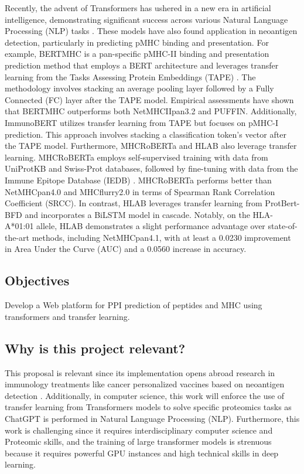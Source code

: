 \documentclass[a4paper,11pt]{article}
\begin{document}
Recently, the advent of Transformers has ushered in a new era in artificial intelligence, demonstrating significant success across various Natural Language Processing (NLP) tasks \cite{patwardhan2023transformers}. These models have also found application in neoantigen detection, particularly in predicting pMHC binding and presentation. For example, BERTMHC \cite{cheng2021bertmhc} is a pan-specific pMHC-II binding and presentation prediction method that employs a BERT architecture and leverages transfer learning from the Tasks Assessing Protein Embeddings (TAPE) \cite{rao2019evaluating}. The methodology involves stacking an average pooling layer followed by a Fully Connected (FC) layer after the TAPE model. Empirical assessments have shown that BERTMHC outperforms both NetMHCIIpan3.2 and PUFFIN. Additionally, ImmunoBERT \cite{gasser2021interpreting} utilizes transfer learning from TAPE but focuses on pMHC-I prediction. This approach involves stacking a classification token's vector after the TAPE model. Furthermore, MHCRoBERTa \cite{wang2022mhcroberta} and HLAB \cite{zhang2022hlab} also leverage transfer learning. MHCRoBERTa employs self-supervised training with data from UniProtKB and Swiss-Prot databases, followed by fine-tuning with data from the Immune Epitope Database (IEDB) \cite{vita2019immune}. MHCRoBERTa performs better than NetMHCpan4.0 and MHCflurry2.0 in terms of Spearman Rank Correlation Coefficient (SRCC). In contrast, HLAB leverages transfer learning from ProtBert-BFD \cite{elnaggar2021prottrans} and incorporates a BiLSTM model in cascade. Notably, on the HLA-A*01:01 allele, HLAB demonstrates a slight performance advantage over state-of-the-art methods, including NetMHCpan4.1, with at least a 0.0230 improvement in Area Under the Curve (AUC) and a 0.0560 increase in accuracy.

\subsection{Objectives}

Develop  a Web platform for PPI prediction of peptides and MHC using transformers and transfer learning. 

\subsection{Why is this project relevant?}
This proposal is relevant since its implementation opens abroad research in immunology treatments like cancer personalized vaccines based on neoantigen detection \cite{borden2022cancer,chen2021challenges,gopanenko2020main}. Additionally, in computer science, this work will enforce the use of transfer learning from Transformers models to solve specific proteomics tasks as ChatGPT is performed in Natural Language Processing (NLP). Furthermore, this work is challenging since it requires interdisciplinary computer science and Proteomic skills, and the training of large transformer models is strenuous because it requires powerful GPU instances and high technical skills in deep learning.
\end{document}
